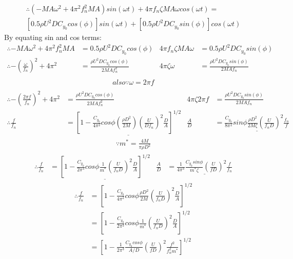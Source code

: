 \begin{appendices}
\begin{multline*}
	\therefore (-MA\omega^2 +4{\pi}^2{f_n^2} M A)sin(\omega t) +4\pi f_n \zeta M A \omega cos(\omega t)= \\ [ 0.5 \rho U^2 D C_{y_0} cos(\phi)] sin(\omega t) + [0.5 \rho U^2 D C_{y_0} sin(\phi)] cos( \omega t)
\end{multline*}
By equating sin and cos terms:
\begin{align*}
	\therefore -MA\omega^2 +4{\pi}^2{f_n^2} M A &= 0.5 \rho U^2 D C_{y_0} cos(\phi) & 4\pi f_n \zeta M A \omega&= 0.5 \rho U^2 D C_{y_0} sin(\phi)\\
	\therefore -(\frac{\omega}{f_n})^2 +4{\pi}^2  &= \frac{\rho U^2 D C_{y_0} cos(\phi)}{2 MAf_n^2}  & 4\pi \zeta {\omega} &= \frac{ \rho U^2 D C_{y_0} sin(\phi)}{2MAf_n}\\
\end{align*}
\begin{gather*}
	also\because \omega=2 \pi f\\
\end{gather*}
\begin{align*}
	\therefore -(\frac{2 \pi f}{f_n})^2 +4{\pi}^2  &= \frac{\rho U^2 D C_{y_0} cos(\phi)}{2 MAf_n^2}  
	& 4\pi \zeta {2 \pi f} &= \frac{ \rho U^2 D C_{y_0} sin(\phi)}{2MAf_n}\\
	\therefore 
	\frac{ f}{f_n}  &=\underline{[1 - \frac{C_{y_0}}{4 \pi^2} cos\phi (\frac{\rho D^2 }{2 M}) (\frac{U}{D f_n})^2 \frac{  D  }{ A}  ]^{1/2}}
	& \frac{  A}{D} &=\underline{ \frac{C_{y_0}}{8\pi^2}sin\phi \frac{\rho D^2}{2 M\zeta} (\frac{U}{f_n D})^2  \frac{  f_n  }{f} }
\end{align*}
\begin{gather*}
\because m^*=\frac{4M}{\pi \rho D^2}
\end{gather*}
\begin{align*}
	\therefore
		\frac{f}{f_n}& = \underline{{  [1-\frac{C_{y_0}}{2\pi^3}cos\phi\frac{1}{m^* }(\frac{U}{f_nD})^2\frac{D}{A  }]^{1/2}	}
		}
	&
	\frac{A}{D}&= \underline{ \frac{1}{4 \pi ^3}  \frac{ C_{y_0} sin \phi}{m^* \zeta} (\frac{U}{fD})^2 \frac{f}{f_{n}} }			
\end{align*}
\begin{align*}
	\therefore
	\frac{f}{f_n}&=[1-\frac{C_{y_0}}{4\pi^2}cos\phi\frac{\rho D^2}{2M}(\frac{U}{f_nD})^2\frac{D}{A  }]^{1/2}\\
	&=[1-\frac{C_{y_0}}{2\pi^3}cos\phi\frac{1}{m^* }(\frac{U}{f_nD})^2\frac{D}{A  }]^{1/2}\\
	&=[1-\frac{1}{2\pi^3}\frac{C_{y_0} cos\phi}{A/D}(\frac{U}{fD})^2\frac{f^2}{f_n^2 m^*   }]^{1/2}\\

\end{align*}
\end{appendices}
